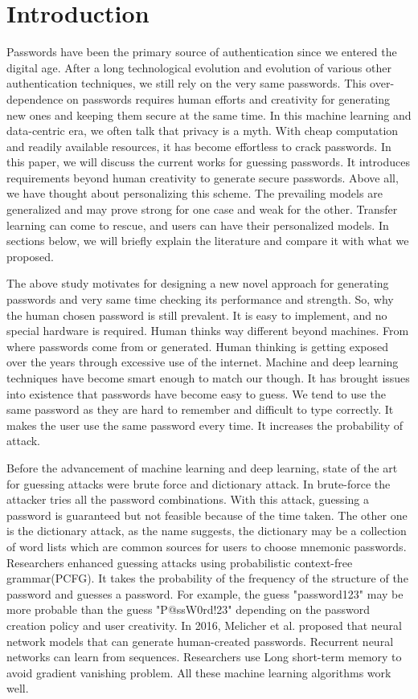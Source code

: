 \documentclass[runningheads]{llncs}
\begin{document}
\section{Introduction}
Passwords have been the primary source of authentication since we entered the digital age. After a long technological evolution and evolution of various other authentication techniques, we still rely on the very same passwords. This over-dependence on passwords requires human efforts and creativity for generating new ones and keeping them secure at the same time. In this machine learning and data-centric era, we often talk that privacy is a myth. With cheap computation and readily available resources, it has become effortless to crack passwords. In this paper, we will discuss the current works for guessing passwords. It introduces requirements beyond human creativity to generate secure passwords. Above all, we have thought about personalizing this scheme. The prevailing models are generalized and may prove strong for one case and weak for the other. Transfer learning can come to rescue, and users can have their personalized models. In sections below, we will briefly explain the literature and compare it with what we proposed.


The above study motivates for designing a new novel approach for generating passwords and very same time checking its performance and strength. So, why the human chosen password is still prevalent. It is easy to implement, and no special hardware is required. Human thinks way different beyond machines. From where passwords come from or generated. Human thinking is getting exposed over the years through excessive use of the internet. Machine and deep learning techniques have become smart enough to match our though. It has brought issues into existence that passwords have become easy to guess. We tend to use the same password as they are hard to remember and difficult to type correctly. It makes the user use the same password every time. It increases the probability of attack. 

Before the advancement of machine learning and deep learning, state of the art for guessing attacks were brute force and dictionary attack. In brute-force \cite{8400211} the attacker tries all the password combinations. With this attack, guessing a password is guaranteed but not feasible because of the time taken. The other one is the dictionary attack, as the name suggests, the dictionary may be a collection of word lists which are common sources for users to choose mnemonic passwords.\cite{8400211} Researchers enhanced guessing attacks using probabilistic context-free grammar(PCFG).\cite{5207658} It takes the probability of the frequency of the structure of the password and guesses a password. For example, the guess "password123" may be more probable than the guess "P@ssW0rd!23" depending on the password creation policy and user creativity. In 2016, Melicher et al. proposed that neural network models that can generate human-created passwords.\cite{197243} Recurrent neural networks can learn from sequences. Researchers use Long short-term memory to avoid gradient vanishing problem. \cite{DBLP:journals/corr/Lipton15} All these machine learning algorithms work well. 
\end{document}
